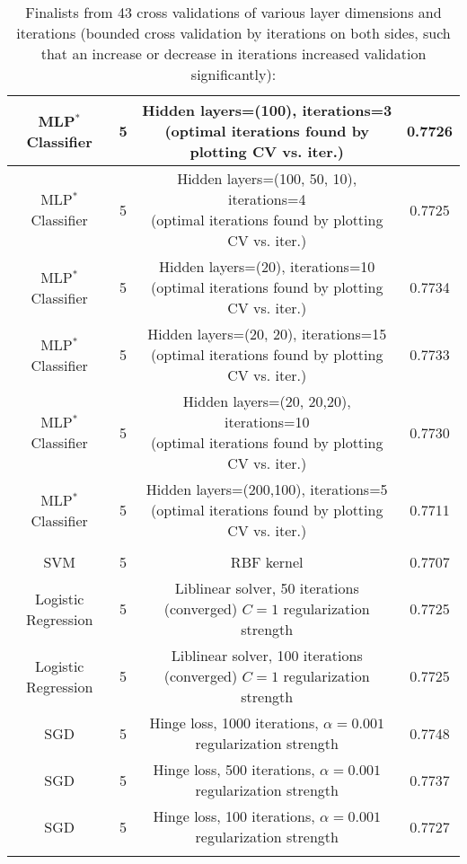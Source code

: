 \begin{longtable}{c|c|c|c}
MLP$^{*}$ Classifier & 5 & \makecell*{Hidden layers=(100), iterations=3 \\ (optimal iterations found by plotting CV vs. iter.)} & 0.7726 \\\hline
MLP$^{*}$ Classifier & 5 & \makecell*{Hidden layers=(100, 50, 10), iterations=4 \\ (optimal iterations found by plotting CV vs. iter.)} & 0.7725 \\\hline
MLP$^{*}$ Classifier & 5 & \makecell*{Hidden layers=(20), iterations=10 \\ (optimal iterations found by plotting CV vs. iter.)} & 0.7734 \\\hline
MLP$^{*}$ Classifier & 5 & \makecell*{Hidden layers=(20, 20), iterations=15 \\ (optimal iterations found by plotting CV vs. iter.)} & 0.7733 \\\hline
MLP$^{*}$ Classifier & 5 & \makecell*{Hidden layers=(20, 20,20), iterations=10 \\ (optimal iterations found by plotting CV vs. iter.)} & 0.7730 \\\hline
MLP$^{*}$ Classifier & 5 & \makecell*{Hidden layers=(200,100), iterations=5 \\ (optimal iterations found by plotting CV vs. iter.)} & 0.7711 \\\hline
\caption{Without data normalization, with de-categorization of data}\\\hline
SVM & 5 & RBF kernel & 0.7707 \\\hline
Logistic Regression & 5 & \makecell*{Liblinear solver, 50 iterations (converged) \\ $C=1$ regularization strength} & 0.7725 \\\hline
Logistic Regression & 5 & \makecell*{Liblinear solver, 100 iterations (converged)\\ $C=1$ regularization strength} & 0.7725 \\\hline
SGD & 5 & \makecell*{Hinge loss, 1000 iterations,\\ $\alpha=0.001$ regularization strength} & 0.7748 \\\hline
SGD & 5 & \makecell*{Hinge loss, 500 iterations,\\ $\alpha=0.001$ regularization strength} & 0.7737 \\\hline
SGD & 5 & \makecell*{Hinge loss, 100 iterations,\\ $\alpha=0.001$ regularization strength} & 0.7727 \\\hline
\caption{Finalists from 43 cross validations of various layer dimensions and iterations (bounded cross validation by iterations on both sides, such that an increase or decrease in iterations increased validation significantly):}\\\hline

\end{longtable}
